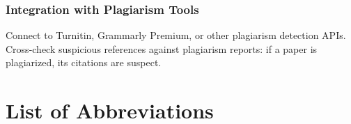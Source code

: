 \documentclass[12pt,a4paper,oneside]{report}
\begin{document}
\subsection{Integration with Plagiarism Tools}

Connect to Turnitin, Grammarly Premium, or other plagiarism detection APIs. Cross-check suspicious references against plagiarism reports: if a paper is plagiarized, its citations are suspect.


\newpage
\chapter*{List of Abbreviations}
\end{document}
